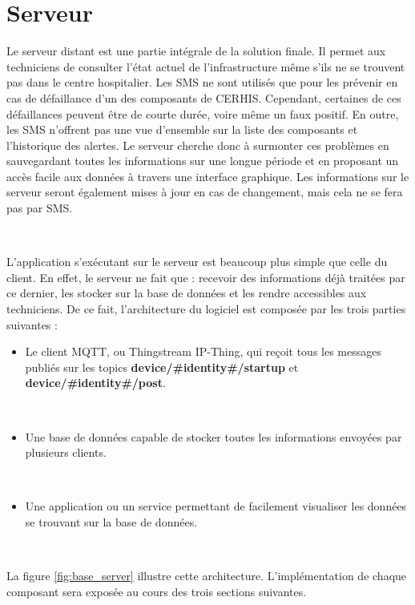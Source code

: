 \section{Serveur}
\label{sec:server}

\noindent
Le serveur distant est une partie intégrale de la solution finale. Il permet aux techniciens de consulter l’état actuel de l’infrastructure même s’ils ne se trouvent pas dans le centre hospitalier. Les SMS ne sont utilisés que pour les prévenir en cas de défaillance d’un des composants de CERHIS. Cependant, certaines de ces défaillances peuvent être de courte durée, voire même un faux positif. En outre, les SMS n’offrent pas une vue d’ensemble sur la liste des composants et l’historique des alertes. Le serveur cherche donc à surmonter ces problèmes en sauvegardant toutes les informations sur une longue période et en proposant un accès facile aux données à travers une interface graphique. Les informations sur le serveur seront également mises à jour en cas de changement, mais cela ne se fera pas par SMS.

~

\noindent
L'application s'exécutant sur le serveur est beaucoup plus simple que celle du client. En effet, le serveur ne fait que : recevoir des informations déjà traitées par ce dernier, les stocker sur la base de données et les rendre accessibles aux techniciens. De ce fait, l’architecture du logiciel est composée par les trois parties suivantes :


\begin{itemize}
  \item Le client MQTT, ou Thingstream IP-Thing, qui reçoit tous les messages publiés sur les topics \textbf{device/\#identity\#/startup} et \textbf{device/\#identity\#/post}.

  ~

  \item Une base de données capable de stocker toutes les informations envoyées par plusieurs clients.

  ~

  \item Une application ou un service permettant de facilement visualiser les données se trouvant sur la base de données.
\end{itemize}

~

\noindent
La figure \ref{fig:base_server} illustre cette architecture. L’implémentation de chaque composant sera exposée au cours des trois sections suivantes.

